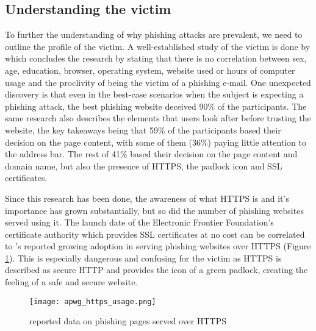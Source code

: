 \subsection{Understanding the victim}
To further the understanding of why phishing attacks are prevalent, we need to
outline the profile of the victim. A well-established study of the victim is
done by \cite{WHY_PHISHING_WORKS} which concludes the research by stating that
there is no correlation between sex, age, education, browser, operating system,
website used or hours of computer usage and the proclivity of being the victim
of a phishing e-mail. One unexpected discovery is that even in the best-case
scenarios when the subject is expecting a phishing attack, the best phishing
website deceived 90\% of the participants. The same research also describes the
elements that users look after before trusting the website, the key takeaways
being that 59\% of the participants based their decision on the page content,
with some of them (36\%) paying little attention to the address bar. The rest of
41\% based their decision on the page content and domain name, but also the
presence of HTTPS, the padlock icon and SSL certificates.

Since this research has been done, the awareness of what HTTPS is and it's
importance has grown substantially, but so did the number of phishing websites
served using it. The launch date of the Electronic Frontier Foundation's
\citep{EFF_LETS_ENCRYPT} certificate authority which provides SSL certificates
at no cost can be correlated to \cite{APWG_Q42019}'s reported growing adoption
in serving phishing websites over HTTPS (Figure \ref{fig:HTTPS_USAGE}). This is
especially dangerous and confusing for the victim as HTTPS is described as
secure HTTP and provides the icon of a green padlock, creating the feeling of a
safe and secure website.

\begin{figure}[t]
	\centering
	\texttt{[image: apwg\_https\_usage.png]}
	\caption{
		\cite{APWG_Q42019} reported data on phishing pages served over HTTPS}
	\label{fig:HTTPS_USAGE}
\end{figure}


